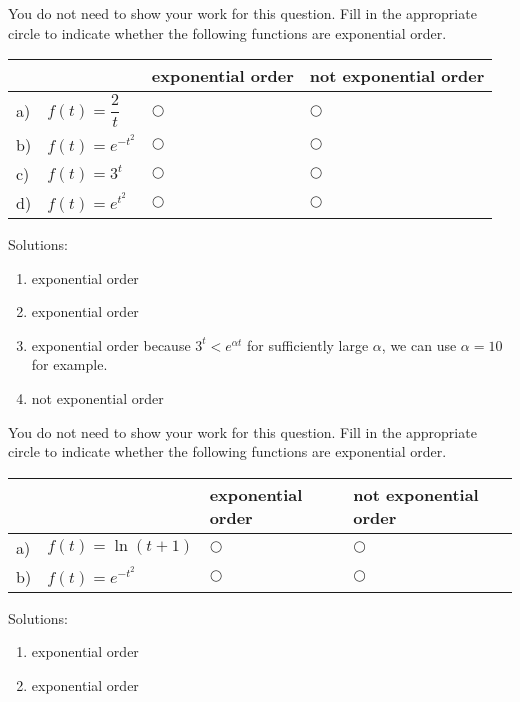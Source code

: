 \ifnum {}
\question[1] You do not need to show your work for this question. Fill in the appropriate circle to indicate whether the following functions are exponential order. 
\vspace{-0.4cm}
\setlength{\extrarowheight}{0.20cm}
\begin{center}
\hspace{-.9cm}\begin{tabular}{ p{0.20cm} p{4cm} p{3.5cm} p{4cm} }
    & & exponential order &  not exponential order  \\[2pt] \hline 
    a) & $f(t) = \displaystyle \dfrac2t $ & $\bigcirc$  & $\bigcirc$ \\[8pt]  
    b) & $f(t) = e^{-t^2}$  & $\bigcirc$  & $\bigcirc$ \\[8pt] 
    c) & $f(t) = 3^t$  & $\bigcirc$  & $\bigcirc$ \\[8pt] 
    d) & $f(t) = e^{t^2}$  & $\bigcirc$  & $\bigcirc$ \\[8pt] 
    \hline
\end{tabular}
\end{center}
\setlength{\extrarowheight}{0.0cm}
\ifnum {} {\color{DarkBlue} Solutions: 
\begin{enumerate}[label=(\alph*)]
    \item exponential order
    \item exponential order 
    \item exponential order because $3^t < e^{\alpha t}$ for sufficiently large $\alpha $, we can use $\alpha = 10$ for example. 
    \item not exponential order
\end{enumerate}
}
\fi
\vspace{-6pt} 
\fi 



\ifnum {}
\newpage
\question[1] You do not need to show your work for this question. Fill in the appropriate circle to indicate whether the following functions are exponential order. 
\vspace{-0.4cm}
\setlength{\extrarowheight}{0.20cm}
\begin{center}
\hspace{-.9cm}\begin{tabular}{ p{0.20cm} p{4cm} p{3.5cm} p{4cm} }
    & & exponential order &  not exponential order  \\[2pt] \hline 
    a) & $f(t) = \ln(t+1)$ & $\bigcirc$  & $\bigcirc$ \\[8pt]  
    b) & $f(t) = e^{-t^2}$  & $\bigcirc$  & $\bigcirc$ \\[8pt] 
    \hline
\end{tabular}
\end{center}
\setlength{\extrarowheight}{0.0cm}
\ifnum {} {\color{DarkBlue} Solutions: 
\begin{enumerate}[label=(\alph*)]
    \item exponential order 
    \item exponential order
\end{enumerate}
}
\fi
\vspace{-6pt} 
\fi 



